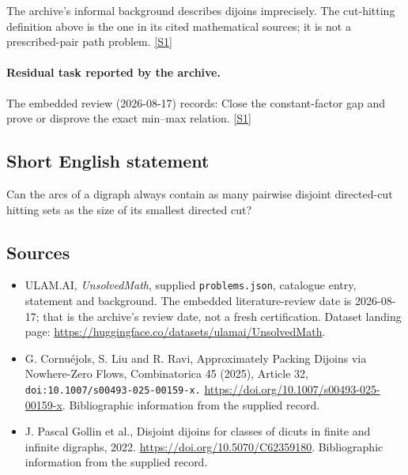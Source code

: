 \documentclass[11pt,a4paper]{article}
\newcommand{\sref}[2]{\hyperlink{source:#1:#2}{[S#2]}}
\begin{document}
The archive’s informal background describes dijoins imprecisely. The cut-hitting definition above is the one in its cited mathematical sources; it is not a prescribed-pair path problem. \sref{statement}{1}

\paragraph{Residual task reported by the archive.}

The embedded review (2026-08-17) records: Close the constant-factor gap and prove or disprove the exact min--max relation. \sref{statement}{1}

\subsection{Short English statement}

Can the arcs of a digraph always contain as many pairwise disjoint directed-cut hitting sets as the size of its smallest directed cut?

\subsection{Sources}

{\small

\begin{itemize}

\item[\hypertarget{source:statement:1}{S1}] ULAM.AI, \emph{UnsolvedMath}, supplied \texttt{problems.json}, catalogue entry, statement and background. The embedded literature-review date is 2026-08-17; that is the archive’s review date, not a fresh certification. Dataset landing page: \url{https://huggingface.co/datasets/ulamai/UnsolvedMath}.

\item[\hypertarget{source:statement:2}{S2}] G. Cornuéjols, S. Liu and R. Ravi, Approximately Packing Dijoins via Nowhere-Zero Flows, Combinatorica 45 (2025), Article 32, \nolinkurl{doi:10.1007/s00493-025-00159-x.} \url{https://doi.org/10.1007/s00493-025-00159-x}. Bibliographic information from the supplied record.

\item[\hypertarget{source:statement:3}{S3}] J. Pascal Gollin et al., Disjoint dijoins for classes of dicuts in finite and infinite digraphs, 2022. \url{https://doi.org/10.5070/C62359180}. Bibliographic information from the supplied record.

\end{itemize}

}

\label{end:statement}
\end{document}
